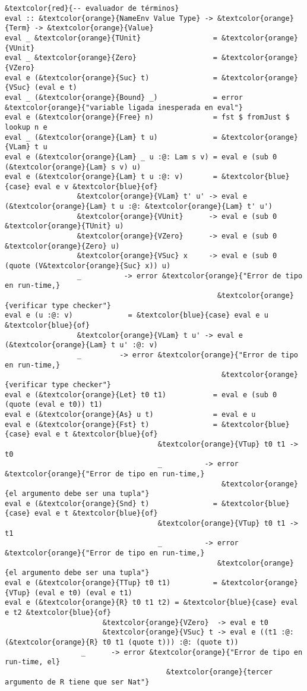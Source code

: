 \documentclass[12pt, a4paper]{article}
\begin{document}
\begin{Verbatim}[commandchars=\&\{\}]
&textcolor{red}{-- evaluador de términos}
eval :: &textcolor{orange}{NameEnv Value Type} -> &textcolor{orange}{Term} -> &textcolor{orange}{Value}
eval _ &textcolor{orange}{TUnit}                 = &textcolor{orange}{VUnit}
eval _ &textcolor{orange}{Zero}                  = &textcolor{orange}{VZero}
eval e (&textcolor{orange}{Suc} t)               = &textcolor{orange}{VSuc} (eval e t)
eval _ (&textcolor{orange}{Bound} _)             = error &textcolor{orange}{"variable ligada inesperada en eval"}
eval e (&textcolor{orange}{Free} n)              = fst $ fromJust $ lookup n e
eval _ (&textcolor{orange}{Lam} t u)             = &textcolor{orange}{VLam} t u
eval e (&textcolor{orange}{Lam} _ u :@: Lam s v) = eval e (sub 0 (&textcolor{orange}{Lam} s v) u)
eval e (&textcolor{orange}{Lam} t u :@: v)       = &textcolor{blue}{case} eval e v &textcolor{blue}{of}
                 &textcolor{orange}{VLam} t' u' -> eval e (&textcolor{orange}{Lam} t u :@: &textcolor{orange}{Lam} t' u')
                 &textcolor{orange}{VUnit}      -> eval e (sub 0 &textcolor{orange}{TUnit} u)
                 &textcolor{orange}{VZero}      -> eval e (sub 0 &textcolor{orange}{Zero} u)
                 &textcolor{orange}{VSuc} x     -> eval e (sub 0 (quote (V&textcolor{orange}{Suc} x)) u)
                 _          -> error &textcolor{orange}{"Error de tipo en run-time,}
                                                  &textcolor{orange}{verificar type checker"}
eval e (u :@: v)             = &textcolor{blue}{case} eval e u &textcolor{blue}{of}
                 &textcolor{orange}{VLam} t u' -> eval e (&textcolor{orange}{Lam} t u' :@: v)
                 _         -> error &textcolor{orange}{"Error de tipo en run-time,}
                                                   &textcolor{orange}{verificar type checker"}
eval e (&textcolor{orange}{Let} t0 t1)           = eval e (sub 0 (quote (eval e t0)) t1)
eval e (&textcolor{orange}{As} u t)              = eval e u
eval e (&textcolor{orange}{Fst} t)               = &textcolor{blue}{case} eval e t &textcolor{blue}{of}
                                    &textcolor{orange}{VTup} t0 t1 -> t0
                                    _          -> error &textcolor{orange}{"Error de tipo en run-time,}
                                                   &textcolor{orange}{el argumento debe ser una tupla"}
eval e (&textcolor{orange}{Snd} t)               = &textcolor{blue}{case} eval e t &textcolor{blue}{of}
                                    &textcolor{orange}{VTup} t0 t1 -> t1
                                    _          -> error &textcolor{orange}{"Error de tipo en run-time,}
                                                  &textcolor{orange}{el argumento debe ser una tupla"}
eval e (&textcolor{orange}{TTup} t0 t1)          = &textcolor{orange}{VTup} (eval e t0) (eval e t1)
eval e (&textcolor{orange}{R} t0 t1 t2) = &textcolor{blue}{case} eval e t2 &textcolor{blue}{of}
                       &textcolor{orange}{VZero}  -> eval e t0
                       &textcolor{orange}{VSuc} t -> eval e ((t1 :@: (&textcolor{orange}{R} t0 t1 (quote t))) :@: (quote t))
	              _      -> error &textcolor{orange}{"Error de tipo en run-time, el} 
	                                  &textcolor{orange}{tercer argumento de R tiene que ser Nat"}



\end{Verbatim}
\end{document}

